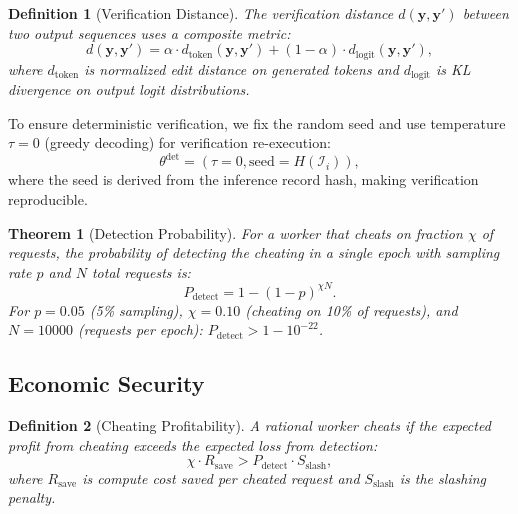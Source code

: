 \documentclass[11pt]{article}
\newtheorem{theorem}{Theorem}
\newtheorem{definition}{Definition}
\begin{document}
\begin{definition}[Verification Distance]
The verification distance $d(\mathbf{y}, \mathbf{y}')$ between two output
sequences uses a composite metric:
\begin{equation}
d(\mathbf{y}, \mathbf{y}') = \alpha \cdot d_{\text{token}}(\mathbf{y},
\mathbf{y}') + (1 - \alpha) \cdot d_{\text{logit}}(\mathbf{y}, \mathbf{y}'),
\end{equation}
where $d_{\text{token}}$ is normalized edit distance on generated tokens and
$d_{\text{logit}}$ is KL divergence on output logit distributions.
\end{definition}

To ensure deterministic verification, we fix the random seed and use
temperature $\tau = 0$ (greedy decoding) for verification re-execution:
\begin{equation}
\theta^{\text{det}} = (\tau = 0, \text{seed} = H(\mathcal{I}_i)),
\end{equation}
where the seed is derived from the inference record hash, making verification
reproducible.

\begin{theorem}[Detection Probability]
For a worker that cheats on fraction $\chi$ of requests, the probability of
detecting the cheating in a single epoch with sampling rate $p$ and $N$ total
requests is:
\begin{equation}
P_{\text{detect}} = 1 - (1 - p)^{\chi N}.
\end{equation}
For $p = 0.05$ (5\% sampling), $\chi = 0.10$ (cheating on 10\% of requests),
and $N = 10000$ (requests per epoch): $P_{\text{detect}} > 1 - 10^{-22}$.
\end{theorem}

\subsection{Economic Security}

\begin{definition}[Cheating Profitability]
A rational worker cheats if the expected profit from cheating exceeds the
expected loss from detection:
\begin{equation}
\chi \cdot R_{\text{save}} > P_{\text{detect}} \cdot S_{\text{slash}},
\end{equation}
where $R_{\text{save}}$ is compute cost saved per cheated request and
$S_{\text{slash}}$ is the slashing penalty.
\end{definition}
\end{document}
